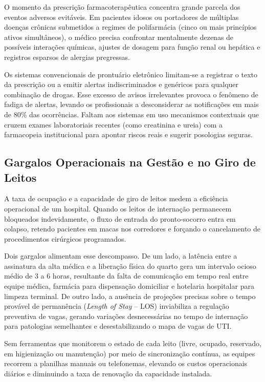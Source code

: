 O momento da prescrição farmacoterapêutica concentra grande parcela dos eventos adversos evitáveis. Em pacientes idosos ou portadores de múltiplas doenças crônicas submetidos a regimes de polifarmácia (cinco ou mais princípios ativos simultâneos), o médico precisa confrontar mentalmente dezenas de possíveis interações químicas, ajustes de dosagem para função renal ou hepática e registros esparsos de alergias pregressas.

Os sistemas convencionais de prontuário eletrônico limitam-se a registrar o texto da prescrição ou a emitir alertas indiscriminados e genéricos para qualquer combinação de drogas. Esse excesso de avisos irrelevantes provoca o fenômeno de fadiga de alertas, levando os profissionais a desconsiderar as notificações em mais de 80\% das ocorrências. Faltam aos sistemas em uso mecanismos contextuais que cruzem exames laboratoriais recentes (como creatinina e ureia) com a farmacopeia institucional para apontar riscos reais e sugerir posologias seguras.

\subsection{Gargalos Operacionais na Gestão e no Giro de Leitos}

A taxa de ocupação e a capacidade de giro de leitos medem a eficiência operacional de um hospital. Quando os leitos de internação permanecem bloqueados indevidamente, o fluxo de entrada do pronto-socorro entra em colapso, retendo pacientes em macas nos corredores e forçando o cancelamento de procedimentos cirúrgicos programados.

Dois gargalos alimentam esse descompasso. De um lado, a latência entre a assinatura da alta médica e a liberação física do quarto gera um intervalo ocioso médio de 3 a 6 horas, resultante da falta de comunicação em tempo real entre equipe médica, farmácia para dispensação domiciliar e hotelaria hospitalar para limpeza terminal. De outro lado, a ausência de projeções precisas sobre o tempo provável de permanência (\textit{Length of Stay} -- LOS) inviabiliza a regulação preventiva de vagas, gerando variações desnecessárias no tempo de internação para patologias semelhantes e desestabilizando o mapa de vagas de UTI.

Sem ferramentas que monitorem o estado de cada leito (livre, ocupado, reservado, em higienização ou manutenção) por meio de sincronização contínua, as equipes recorrem a planilhas manuais ou telefonemas, elevando os custos operacionais diários e diminuindo a taxa de renovação da capacidade instalada.

